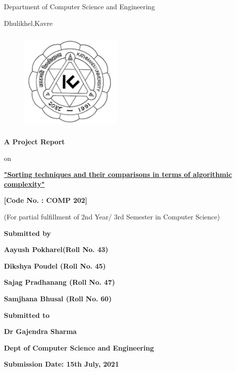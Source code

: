 \documentclass{article}
\begin{document}
\thispagestyle{empty}

\section*{}
{\LARGE{}}

\centerline{Department of Computer Science and Engineering}
\centerline{Dhulikhel,Kavre}
\begin{figure}[h]
    \centerline{\includegraphics[width=50.546mm,height=50.546mm]{KU_Logo.png}}
\end{figure}

\centerline{\textbf{A Project Report}}
\centerline{on}
\centerline{\underline{\textbf{"Sorting techniques and their comparisons in terms of algorithmic complexity"}}}

\vspace*{12mm}

\centerline{\textbf{[Code No. : COMP 202]}}
\centerline{(For partial fulfillment of 2nd Year/ 3rd Semester in Computer Science)}

\vspace*{10mm}

\centerline{\textbf{Submitted by}}
\centerline{\textbf{Aayush Pokharel(Roll No. 43)}}
\centerline{\textbf{Dikshya Poudel (Roll No. 45)}}
\centerline{\textbf{Sajag Pradhanang (Roll No. 47)}}
\centerline{\textbf{Samjhana Bhusal (Roll No. 60)}}

\vspace*{16mm}


\centerline{\textbf{Submitted to}}
\centerline{\textbf{Dr Gajendra Sharma}}
\centerline{\textbf{Dept of Computer Science and Engineering}}

\vspace*{10mm}

\centerline{\textbf{Submission Date: 15th July, 2021}}



\clearpage
\thispagestyle{empty}
\end{document}
